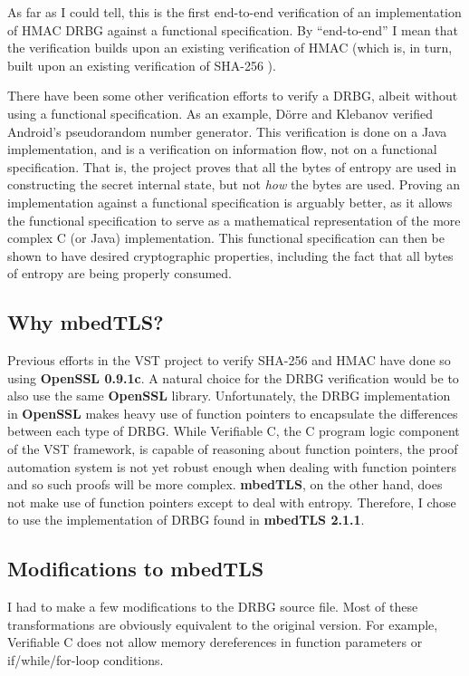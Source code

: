 \documentclass[pageno]{jpaper}
\newcommand{\stdtitle}[1]{\textbf{#1}}
\begin{document}
As far as I could tell, this is the first end-to-end verification of an implementation of HMAC DRBG against a functional specification. By “end-to-end” I mean that the verification builds upon an existing verification of HMAC \cite{hmac} (which is, in turn, built upon an existing verification of SHA-256 \cite{sha}).

There have been some other verification efforts to verify a DRBG, albeit without using a functional specification. As an example, D{\"o}rre and Klebanov \cite{prng} verified Android’s pseudorandom number generator. This verification is done on a Java implementation, and is a verification on information flow, not on a functional specification. That is, the project proves that all the bytes of entropy are used in constructing the secret internal state, but not \textit{how} the bytes are used. Proving an implementation against a functional specification is arguably better, as it allows the functional specification to serve as a mathematical representation of the more complex C (or Java) implementation. This functional specification can then be shown to have desired cryptographic properties, including the fact that all bytes of entropy are being properly consumed.


\subsection{Why mbedTLS?}

Previous efforts in the VST project to verify SHA-256 \cite{sha} and HMAC \cite{hmac} have done so using \stdtitle{OpenSSL 0.9.1c}. A natural choice for the DRBG verification would be to also use the same \stdtitle{OpenSSL} library. Unfortunately, the DRBG implementation in \stdtitle{OpenSSL} makes heavy use of function pointers to encapsulate the differences between each type of DRBG. While Verifiable C, the C program logic component of the VST framework, is capable of reasoning about function pointers, the proof automation system is not yet robust enough when dealing with function pointers and so such proofs will be more complex. \stdtitle{mbedTLS}, on the other hand, does not make use of function pointers except to deal with entropy. Therefore, I chose to use the implementation of DRBG found in \stdtitle{mbedTLS 2.1.1}.

\subsection{Modifications to mbedTLS}
I had to make a few modifications to the  DRBG source file. Most of these transformations are obviously equivalent to the original version. For example, Verifiable C does not allow memory dereferences in function parameters or if/while/for-loop conditions.
\end{document}
